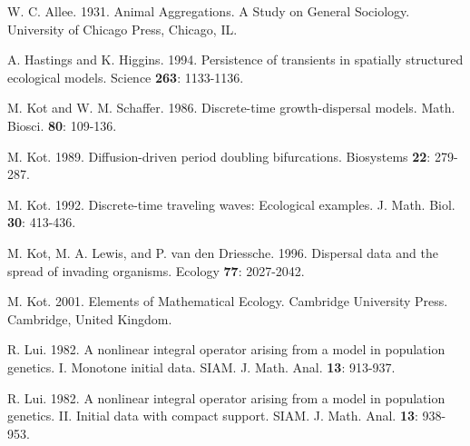 \documentclass[11pt]{article}
\theoremstyle{definition}
\numberwithin{equation}{section}
\numberwithin{thm}{section}
\begin{document}


\begin{thebibliography}{9}
  W. C. Allee. 1931. Animal Aggregations. A Study on
General Sociology. University of Chicago Press, Chicago, IL.



 A. Hastings and K. Higgins. 1994. Persistence of transients in spatially
structured ecological models. Science {\bf 263}: 1133-1136.



 M. Kot and W. M. Schaffer. 1986.  Discrete-time growth-dispersal models.
Math. Biosci. {\bf 80}: 109-136.


 M. Kot. 1989. Diffusion-driven period doubling bifurcations.
Biosystems {\bf 22}: 279-287.


 M. Kot. 1992. Discrete-time traveling waves:
Ecological examples. J. Math. Biol. {\bf 30}: 413-436.


 M. Kot, M. A. Lewis, and P. van den Driessche. 1996. Dispersal data and the spread of invading
organisms. Ecology {\bf 77}: 2027-2042.






 M. Kot. 2001. Elements of Mathematical Ecology.
Cambridge University Press. Cambridge, United Kingdom.

 R. Lui. 1982. A nonlinear integral operator arising from a model in population
genetics. I. Monotone initial data. SIAM. J. Math. Anal. {\bf 13}:
913-937.

 R. Lui. 1982. A nonlinear integral operator arising from a model in population
genetics. II. Initial data with compact support. SIAM. J. Math.
Anal. {\bf 13}: 938-953.


\end{thebibliography}
\end{document}
